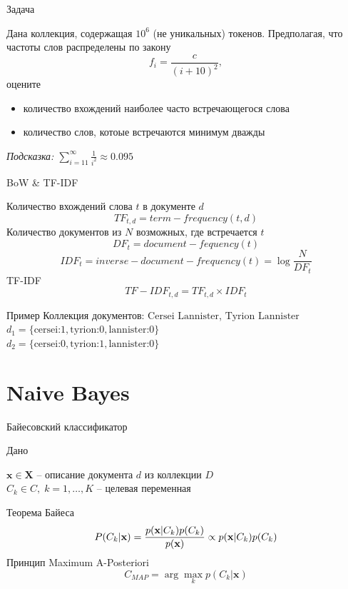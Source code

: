 \documentclass[10pt,a4paper]{beamer}
\begin{document}

\begin{frame}{Задача}

Дана коллекция, содержащая $10^6$ (не уникальных) токенов. Предполагая, что частоты слов распределены по закону
\[
f_i = \frac{c}{(i + 10)^2},
\]
оцените
\begin{itemize}
\item количество вхождений наиболее часто встречающегося слова
\item количество слов, котоые встречаются минимум дважды
\end{itemize}

\vspace{1em}
{\it Подсказка: $\sum_{i=11}^{\infty}\frac{1}{i^2} \approx 0.095$}

\end{frame}


\begin{frame}{BoW \& TF-IDF}

\vspace{1em}
Количество вхождений слова $t$ в документе $d$
\[
TF_{t,d} = term\!\!-\!\!frequency(t, d)
\]
Количество документов из $N$ возможных, где встречается $t$
\[
DF_t = document\!\!-\!\!fequency(t)
\]
\[
IDF_t = inverse\!\!-\!\!document\!\!-\!\!frequency(t) = \log \frac{N}{DF_t}
\]
TF-IDF
\[
TF\!\!-\!\!IDF_{t,d} = TF_{t,d} \times IDF_t
\]
\begin{exampleblock}{Пример}
Коллекция документов: $\text{Cersei Lannister}$, $\text{Tyrion Lannister}$ \\
$d_1 = \{\text{cersei:}1,\text{tyrion:}0,\text{lannister:}0\}$ \\
$d_2 = \{\text{cersei:}0,\text{tyrion:}1,\text{lannister:}0\}$
\end{exampleblock}

\end{frame}


\section{Naive Bayes}


\begin{frame}{Байесовский классификатор}

Дано

$\mathbf{x} \in \mathbf{X}$ -- описание документа $d$ из коллекции $D$ \\
$C_k \in C, \; k = 1,\ldots,K$ -- целевая переменная

\vspace{1em}
Теорема Байеса
\[
P(C_k | \textbf{x}) = \frac{p(\textbf{x} | C_k) p(C_k)}{p(\textbf x)} \propto p(\textbf{x} | C_k) p(C_k)
\]
Принцип Maximum A-Posteriori
\[
C_{MAP} = \arg \max_k p(C_k | \textbf{x})
\]

\end{frame}
\end{document}
